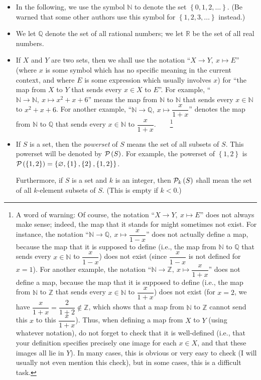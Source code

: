 \documentclass[numbers=enddot,12pt,final,onecolumn,notitlepage]{scrartcl}%
\theoremstyle{definition}
\newcommand{\NN}{\mathbb{N}}
\newcommand{\ZZ}{\mathbb{Z}}
\newcommand{\QQ}{\mathbb{Q}}
\newcommand{\RR}{\mathbb{R}}
\newcommand{\powset}[2][]{\ifthenelse{\equal{#2}{}}{\mathcal{P}\left(#1\right)}{\mathcal{P}_{#1}\left(#2\right)}}
\begin{document}
\begin{itemize}
\item In the following, we use the symbol $\NN$ to denote the set
$\left\{ 0, 1, 2, \ldots \right\}$. (Be warned that some other authors
use this symbol for $\left\{ 1, 2, 3, \ldots \right\}$ instead.)

\item We let $\QQ$ denote the set of all rational numbers; we let
$\RR$ be the set of all real numbers.

\item If $X$ and $Y$ are two sets, then we shall use the notation
``$X\rightarrow Y,\ x\mapsto E$'' (where $x$
is some symbol which has no specific meaning in the current context,
and where $E$ is some expression which usually involves $x$) for ``the
map from $X$ to $Y$ that sends every $x\in X$ to $E$''. For
example, ``$\NN\rightarrow\NN,\ x\mapsto x^{2}+x+6$'' means the map
from $\NN$ to $\NN$ that sends every $x\in\NN$ to $x^{2}+x+6$. For
another example, ``$\NN\rightarrow\QQ,\ x\mapsto\dfrac{x}{1+x}$''
denotes the map from $\NN$ to $\QQ$ that
sends every $x\in\NN$ to $\dfrac{x}{1+x}$.\ \ \ \ \footnote{A word of
warning: Of course, the notation ``$X\rightarrow Y,\ x\mapsto E$''
does not always make sense; indeed, the map that it
stands for might sometimes not exist. For instance, the notation
``$\NN\rightarrow\QQ,\ x\mapsto\dfrac{x}{1-x}$'' does not actually
define a map, because the map that it
is supposed to define (i.e., the map from $\NN$ to $\QQ$ that
sends every $x\in\NN$ to $\dfrac{x}{1-x}$) does not exist (since
$\dfrac{x}{1-x}$ is not defined for $x=1$). For another example, the
notation ``$\NN\rightarrow\ZZ,\ x\mapsto\dfrac{x}{1+x}$'' does not
define a map, because the map that it is
supposed to define (i.e., the map from $\NN$ to $\ZZ$ that
sends every $x\in\NN$ to $\dfrac{x}{1+x}$) does not exist (for $x=2$,
we have $\dfrac{x}{1+x}=\dfrac{2}{1+2}\notin\ZZ$, which shows that a
map from $\NN$ to $\ZZ$ cannot send this $x$ to this $\dfrac
{x}{1+x}$). Thus, when defining a map from $X$ to $Y$ (using whatever
notation), do not forget to check that it is well-defined (i.e., that
your definition specifies precisely one image for each $x\in X$, and
that these images all lie in $Y$). In many cases, this is obvious or
very easy to check (I will usually not even mention this check), but
in some cases, this is a difficult task.}

\item If $S$ is a set, then the \textit{powerset} of $S$ means the set
of all subsets of $S$. This powerset will be denoted by
$\powset{S}$. %
For example, the powerset of $\left\{  1,2\right\}  $ is
$\powset{ \left\{  1,2\right\} }
=\left\{  \varnothing,\left\{
1\right\}  ,\left\{  2\right\}  ,\left\{  1,2\right\}  \right\}  $.

Furthermore, if $S$ is a set and $k$ is an integer, then
$\powset[k]{S}$ %
shall mean the set of all $k$-element subsets of $S$. (This is empty
if $k < 0$.)
\end{itemize}
\end{document}

